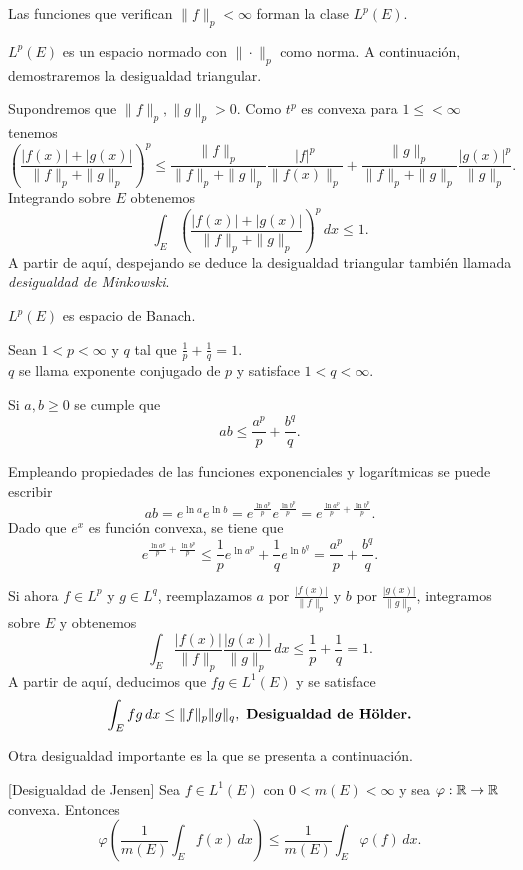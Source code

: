 Las funciones que verifican $\|f\|_p<\infty$ forman la clase $L^p(E)$.

$L^p(E)$ es un espacio normado con $\|\cdot \|_p$ como norma. A  continuaci\'on, demostraremos la desigualdad triangular. 

Supondremos que $\|f\|_p,\|g\|_p>0$. Como $t^p$ es convexa para $1\leq <\infty$ tenemos 
\[
\left( \frac{|f(x)|+|g(x)|}{\|f\|_p+\|g\|_p}   \right)^p \leq 
\frac{\|f\|_p}{\|f\|_p+\|g\|_p} \frac{|f|^p}{\|f(x)\|_p}+  
\frac{\|g\|_p}{\|f\|_p+\|g\|_p} \frac{|g(x)|^p}{\|g\|_p}.
\]
Integrando sobre $E$ obtenemos
\[
\int_E \left(\frac{|f(x)|+|g(x)|}{\|f\|_p+\|g\|_p}\right)^p \,dx\leq 1.
\]
A partir de aqu\'i, despejando se deduce la desigualdad triangular tambi\'en llamada \emph{desigualdad de Minkowski}.

\begin{ejercicio}{}
$L^p(E)$ es espacio de Banach.
\end{ejercicio}

Sean $1<p<\infty$ y $q$ tal que $\frac{1}{p}+\frac{1}{q}=1$. \\$q$ se llama exponente conjugado de $p$ y satisface  $1<q<\infty$.

\begin{lema}{}
 Si $a,b\geq 0$ se cumple que
\[ab\leq \frac{a^p}{p}+\frac{b^q}{q}.\]
\end{lema}

\begin{demo}
Empleando propiedades de las funciones exponenciales y logar\'itmicas se puede escribir
\[
ab=e^{\ln a} e^{\ln b}=e^{\frac{\ln a^p}{p}} e^{\frac{\ln b^p}{p}}=
e^{\frac{\ln a^p}{p}+\frac{\ln b^p}{p}}.
\]
Dado que $e^x$ es funci\'on convexa, se tiene que 
\[
e^{\frac{\ln a^p}{p}+\frac{\ln b^p}{p}}
\leq 
\frac{1}{p} e^{\ln a^p}+\frac{1}{q}e^{\ln b^q}=\frac{a^p}{p}+\frac{b^q}{q}.
\]
\end{demo}

Si ahora $f \in L^p$ y $g \in L^q$, reemplazamos $a$ por $\frac{|f(x)|}{\|f\|_p}$ y $b$ por $\frac{|g(x)|}{\|g\|_p}$,   
integramos sobre $E$ y obtenemos
\[
\int_E \frac{|f(x)|}{\|f\|_p} \frac{|g(x)|}{\|g\|_p} \,dx \leq \frac{1}{p}+\frac{1}{q}=1.
\]
A partir de aqu\'i, deducimos que $fg\in L^1(E)$ y se satisface 
\[
\int_E fg \,dx \leq \|f\|_p \|g\|_q, \mbox{ \textbf{Desigualdad de H\"older.}}
\]

Otra desigualdad importante es la  que se presenta a continuaci\'on.

\begin{lema}{}[Desigualdad de Jensen]
 Sea $f \in L^1(E)$ con $0<m(E)<\infty$ y sea $\varphi:\mathbb{R} \to \mathbb{R}$ convexa. Entonces
 \[
 \varphi\left( \frac{1}{m(E)}\int_E f(x)\,dx \right) \leq \frac{1}{m(E)} \int_E \varphi(f)\,dx.
 \]
 \end{lema}

